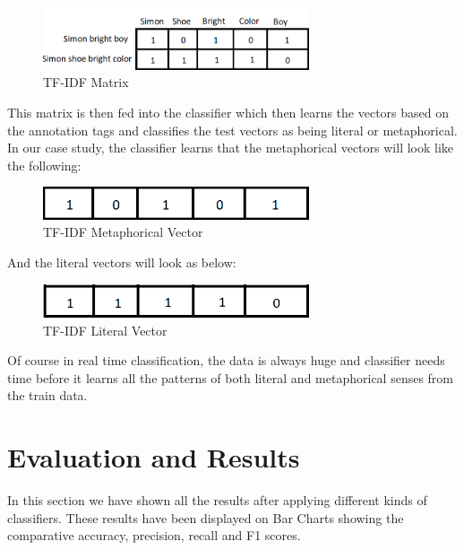 \documentclass[a4paper]{article}
\begin{document}
\begin{figure}[h!]
  \centering
  \includegraphics[width=0.7\textwidth]{Tf_Idf}
  \caption{TF-IDF Matrix}
\end{figure}

This matrix is then fed into the classifier which then learns the vectors based on the annotation tags and classifies the test vectors as being literal or metaphorical. In our case study, the classifier learns that the metaphorical vectors will look like the following:

\begin{figure}[h!]
  \centering
  \includegraphics[width=0.7\textwidth]{Tf_Idf_Y}
  \caption{TF-IDF Metaphorical Vector}
\end{figure}

And the literal vectors will look as below:

\begin{figure}[h!]
  \centering
  \includegraphics[width=0.7\textwidth]{Tf_Idf_N}
  \caption{TF-IDF Literal Vector}
\end{figure}

Of course in real time classification, the data is always huge and classifier needs time before it learns all the patterns of both literal and metaphorical senses from the train data.

\section{Evaluation and Results}
In this section we have shown all the results after applying different kinds of classifiers. These results have been displayed on Bar Charts showing the comparative accuracy, precision, recall and F1 scores.
\end{document}
